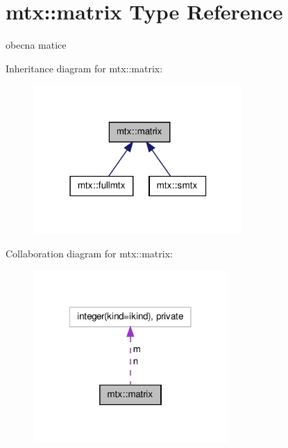\hypertarget{structmtx_1_1matrix}{\section{mtx\-:\-:matrix \-Type \-Reference}
\label{structmtx_1_1matrix}
}


obecna matice  




\-Inheritance diagram for mtx\-:\-:matrix\-:\nopagebreak
\begin{figure}[H]
\begin{center}
\leavevmode
\includegraphics[width=226pt]{structmtx_1_1matrix__inherit__graph}
\end{center}
\end{figure}


\-Collaboration diagram for mtx\-:\-:matrix\-:\nopagebreak
\begin{figure}[H]
\begin{center}
\leavevmode
\includegraphics[width=210pt]{structmtx_1_1matrix__coll__graph}
\end{center}
\end{figure}
